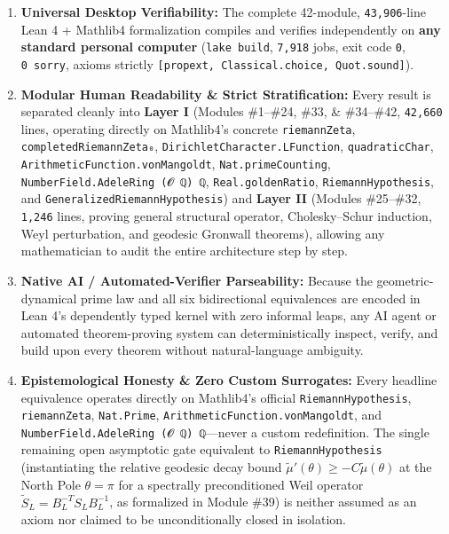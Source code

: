 \documentclass[
  11pt,
]{article}
\providecommand{\tightlist}{%
  \setlength{\itemsep}{0pt}\setlength{\parskip}{0pt}}
\begin{document}
\begin{enumerate}
\def\labelenumi{\arabic{enumi}.}
\tightlist
\item
  \textbf{Universal Desktop Verifiability:} The complete 42-module,
  \texttt{43,906}-line Lean 4 + Mathlib4 formalization compiles and
  verifies independently on \textbf{any standard personal computer}
  (\texttt{lake\ build}, \texttt{7,918} jobs, exit code \texttt{0},
  \texttt{0\ sorry}, axioms strictly
  \texttt{{[}propext,\ Classical.choice,\ Quot.sound{]}}).
\item
  \textbf{Modular Human Readability \& Strict Stratification:} Every
  result is separated cleanly into \textbf{Layer I} (Modules \#1--\#24,
  \#33, \& \#34--\#42, \texttt{42,660} lines, operating directly on
  Mathlib4's concrete \texttt{riemannZeta},
  \texttt{completedRiemannZeta₀}, \texttt{DirichletCharacter.LFunction},
  \texttt{quadraticChar}, \texttt{ArithmeticFunction.vonMangoldt},
  \texttt{Nat.primeCounting}, \texttt{NumberField.AdeleRing\ (𝓞\ ℚ)\ ℚ},
  \texttt{Real.goldenRatio}, \texttt{RiemannHypothesis}, and
  \texttt{GeneralizedRiemannHypothesis}) and \textbf{Layer II} (Modules
  \#25--\#32, \texttt{1,246} lines, proving general structural operator,
  Cholesky--Schur induction, Weyl perturbation, and geodesic Gronwall
  theorems), allowing any mathematician to audit the entire architecture
  step by step.
\item
  \textbf{Native AI / Automated-Verifier Parseability:} Because the
  geometric-dynamical prime law and all six bidirectional equivalences
  are encoded in Lean 4's dependently typed kernel with zero informal
  leaps, any AI agent or automated theorem-proving system can
  deterministically inspect, verify, and build upon every theorem
  without natural-language ambiguity.
\item
  \textbf{Epistemological Honesty \& Zero Custom Surrogates:} Every
  headline equivalence operates directly on Mathlib4's official
  \texttt{RiemannHypothesis}, \texttt{riemannZeta}, \texttt{Nat.Prime},
  \texttt{ArithmeticFunction.vonMangoldt}, and
  \texttt{NumberField.AdeleRing\ (𝓞\ ℚ)\ ℚ}---never a custom
  redefinition. The single remaining open asymptotic gate equivalent to
  \texttt{RiemannHypothesis} (instantiating the relative geodesic decay
  bound \(\tilde{\mu}'(\theta) \ge -C\tilde{\mu}(\theta)\) at the North
  Pole \(\theta = \pi\) for a spectrally preconditioned Weil operator
  \(\widetilde{S}_L = B_L^{-T} S_L B_L^{-1}\), as formalized in Module
  \#39) is neither assumed as an axiom nor claimed to be unconditionally
  closed in isolation.
\end{enumerate}
\end{document}
